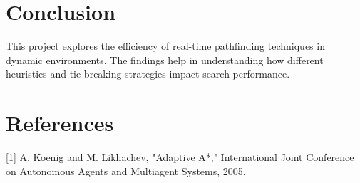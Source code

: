 \documentclass{article}
\begin{document}
\section{Conclusion}
This project explores the efficiency of real-time pathfinding techniques in dynamic environments. The findings help in understanding how different heuristics and tie-breaking strategies impact search performance.

\section{References}
[1] A. Koenig and M. Likhachev, "Adaptive A*," International Joint Conference on Autonomous Agents and Multiagent Systems, 2005.
\end{document}
